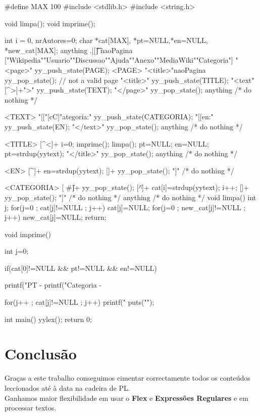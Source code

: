 \documentclass[11pt,a4paper]{article}
\begin{document}
\begin{code_lex}
        #define MAX 100
        #include <stdlib.h>
        #include <string.h>

        void limpa();
        void imprime();

        int i = 0, nrAutores=0;
        char *cat[MAX], *pt=NULL,*en=NULL, *new_cat[MAX];
anything .|[\n\t\r]
naoPagina ["Wikipedia""Usuario""Discussao""Ajuda""Anexo""MediaWiki""Categoria"]
"<page>"                        yy_push_state(PAGE);
<PAGE>{
        "<title>"{naoPagina}    yy_pop_state(); // not a valid page
        "<title>"               yy_push_state(TITLE);
        "<text"[^>]+">"         yy_push_state(TEXT);
        "</page>"               yy_pop_state();
        {anything}              /* do nothing */
}

<TEXT>{
        "[["[cC]"ategoria:"     yy_push_state(CATEGORIA);
        "[[en:"                 yy_push_state(EN);
        "</text>"               yy_pop_state();
        {anything}              /* do nothing */
}

<TITLE>{
        [^<]+                   {
                                        i=0;
                                        imprime(); limpa();
                                        pt=NULL; en=NULL;
                                        pt=strdup(yytext);
                                }
        "</title>"              yy_pop_state();
        {anything}              /* do nothing */
}

<EN>{
        [^\]]+                  en=strdup(yytext);
        [\]]+                   yy_pop_state();
        "]"         /* do nothing */
}

<CATEGORIA>{
        [ \#\!\*\|]+            yy_pop_state();
        [^\]\|\n]+              {
                                        cat[i]=strdup(yytext);
                                        i++;
                                }
        [\]]+                   yy_pop_state();
        "]"         /* do nothing */
}
{anything}                      /* do nothing */
void limpa()
        {
                int j;
                for(j=0 ; cat[j]!=NULL ; j++)
                        cat[j]=NULL;
                for(j=0 ; new_cat[j]!=NULL ; j++)
                        new_cat[j]=NULL;
                return;
        }

void imprime() {
                int j=0;

                if(cat[0]!=NULL && pt!=NULL && en!=NULL)
                {
                        printf("PT - %
                        printf("Categoria - %

                        for(j++ ; cat[j]!=NULL ; j++)
                                printf("            %
                        puts("");
                }
        }

int main() {
        yylex();
        return 0;
}

\end{code_lex}

\section{Conclusão}
Graças a este trabalho conseguimos cimentar correctamente todos os conteúdos leccionados até à data na cadeira de PL.\\
Ganhamos maior flexibilidade em usar o \textbf{Flex} e \textbf{Expressões Regulares} e em processar textos.
\end{document}
